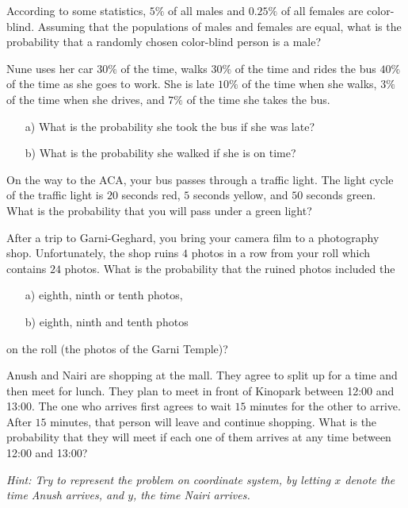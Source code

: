 \bigskip

\begin{problem}
According to some statistics, $5\%$ of all males and $0.25\%$ of all females
are color-blind. Assuming that the populations of males and females
are equal, what is the probability that a randomly chosen color-blind person is a male?
\end{problem}

\bigskip

\begin{problem}
    Nune uses her car $30\%$ of the time, walks $30\%$ of the time and rides the bus $40\%$ of the time as she goes to work. She is late $10\%$ of the time when she walks, $3\%$ of the time when she drives, and $7\%$ of the time she takes the bus.

\begin{enumerate}
    \item[a) ] What is the probability she took the bus if she was late?
    
    \item[b) ] What is the probability she walked if she is on time?
\end{enumerate}

\end{problem}

\bigskip
\begin{problem}
    On the way to the ACA, your
bus passes through a traffic light. The light cycle of the traffic light is $20$
seconds red, $5$ seconds yellow, and $50$ seconds green. What is the
probability that you will pass under a green light?
\end{problem}

\bigskip

\begin{problem}
After a trip to Garni-Geghard, you bring your camera film to a photography shop. Unfortunately, the shop ruins $4$ photos in a row from your roll which contains $24$ photos. What is the probability that the ruined photos included the
\begin{enumerate}
    \item[a) ] eighth, ninth or tenth photos,
    \item[b) ] eighth, ninth and tenth photos
\end{enumerate}
on the roll (the photos of the Garni Temple)?
\end{problem}

\bigskip

\begin{problem}
    Anush and Nairi are shopping at the mall. They agree to split up for a time and then meet for lunch. They plan to meet in
front of Kinopark between 12:00 and 13:00. The one who arrives first agrees to wait $15$ minutes for the other to arrive. After $15$
minutes, that person will leave and continue shopping. What is the probability that they will meet if each one of them arrives at any time between 12:00 and 13:00?

\textit{Hint: Try to represent the problem on coordinate system, by letting
$x$ denote the time Anush arrives, and $y$, the time Nairi arrives.}
\end{problem}

